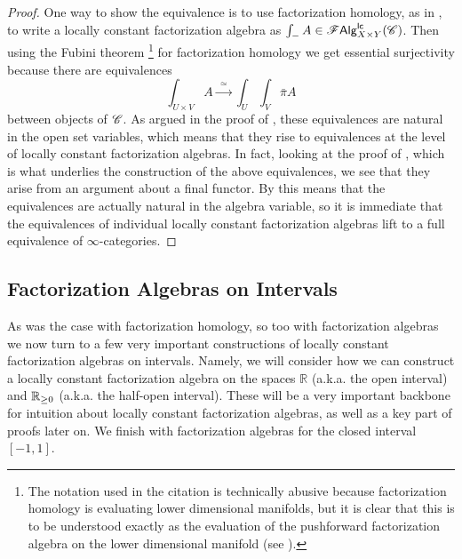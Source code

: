 \documentclass[../text]{subfiles}
\begin{document}
\begin{proof}
    One way to show the equivalence is to use factorization homology, as in , to write a locally constant factorization algebra as $\int_{-} A \in \mathscr{F} \mathsf{Alg}^{\mathsf{lc}}_{X \times Y} (\mathscr{C})$. Then using the Fubini theorem \cite[cor.2.29]{aft_fhstrat}\footnote{The notation used in the citation is technically abusive because factorization homology is evaluating lower dimensional manifolds, but it is clear that this is to be understood exactly as the evaluation of the pushforward factorization algebra on the lower dimensional manifold (see ).} for factorization homology we get essential surjectivity because there are equivalences
    \begin{equation}
        \int_{U \times V} A \xrightarrow{\ \ \simeq \ \ } \int_U \int_V \bar{\pi} A
    \end{equation}
    between objects of $\mathscr{C}$. As argued in the proof of , these equivalences are natural in the open set variables, which means that they rise to equivalences at the level of locally constant factorization algebras. In fact, looking at the proof of \cite[thm.2.25]{aft_fhstrat}, which is what underlies the construction of the above equivalences, we see that they arise from an argument about a final functor. By  this means that the equivalences are actually natural in the algebra variable, so it is immediate that the equivalences of individual locally constant factorization algebras lift to a full equivalence of $\infty$-categories.
\end{proof}




\subsection{Factorization Algebras on Intervals}\label{ssec:lcfa_on_ints}

As was the case with factorization homology, so too with factorization algebras we now turn to a few very important constructions of locally constant factorization algebras on intervals. Namely, we will consider how we can construct a locally constant factorization algebra on the spaces $\mathbb{R}$ (a.k.a. the open interval) and $\mathbb{R}_{\geq 0}$ (a.k.a. the half-open interval). These will be a very important backbone for intuition about locally constant factorization algebras, as well as a key part of proofs later on. We finish with factorization algebras for the closed interval $[-1,1]$.
\end{document}
